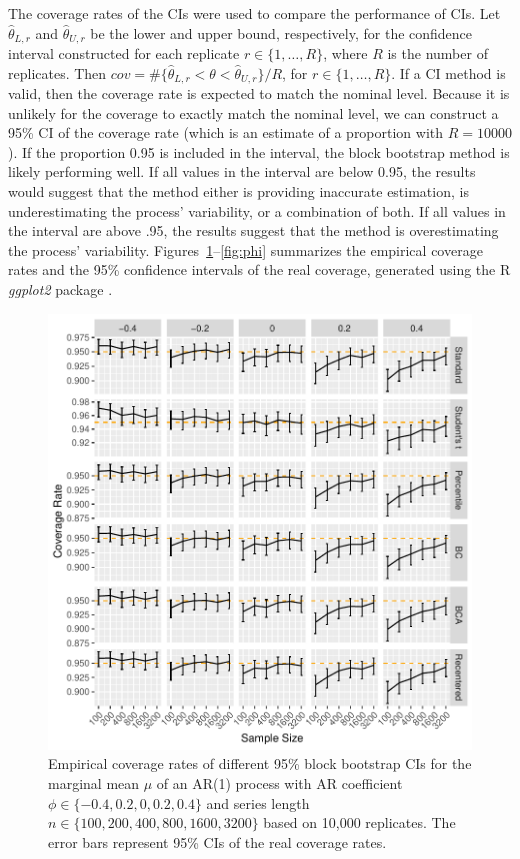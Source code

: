 \documentclass[12pt, letterpaper, titlepage]{article}
\begin{document}
The coverage rates of the CIs were used to compare the performance of CIs. Let
$\hat\theta_{L, r}$ and $\hat\theta_{U, r}$ be the lower and upper bound,
respectively, for the confidence interval constructed for each replicate
$r \in \{1, \ldots, R\}$, where $R$ is the number of replicates. Then
$cov = \#\{\hat\theta_{L, r} < \theta < \hat\theta_{U, r} \}/R$, for
$r \in \{1, \ldots, R\}$. If a CI method is valid, then the coverage rate is
expected to match the nominal level. Because it is unlikely for the coverage
to exactly match the nominal level, we can construct a 95\% CI of the coverage
rate (which is an estimate of a proportion with $R = 10000$). If the proportion
0.95 is included in the interval, the block bootstrap method is likely
performing well. If all values in the interval are below 0.95, the results
would suggest that the method either is providing inaccurate estimation, is
underestimating the process' variability, or a combination of both. If all
values in the interval are above .95, the results suggest that the method is
overestimating the process' variability. Figures~\ref{fig:mu}--\ref{fig:phi}
summarizes the empirical coverage rates and the 95\% confidence intervals of
the real coverage, generated using the R \textsl{ggplot2} package
\citep{ggplot2}.


\begin{figure}[tbp]
  \centering
  \includegraphics[width=\textwidth]{figures/plot_norm_mu}
  \caption{Empirical coverage rates of different 95\% block bootstrap CIs for
    the marginal mean $\mu$ of an AR(1) process with AR coefficient
    $\phi \in \{-0.4, 0.2, 0, 0.2, 0.4\}$ and series length
    $n \in \{100, 200, 400, 800, 1600, 3200\}$ based on 10,000 replicates. The
    error bars represent 95\% CIs of the real coverage rates.}
  \label{fig:mu}
\end{figure}
\end{document}
